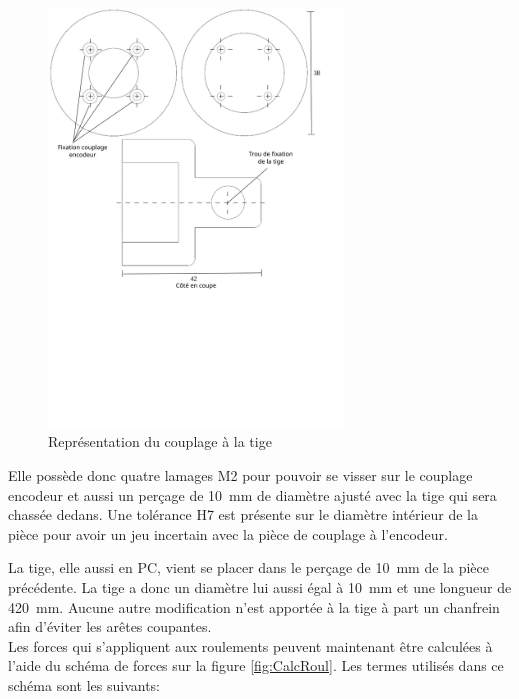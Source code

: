 \begin{figure}[H]
    \centering
    \includegraphics[width = 0.7\textwidth]{assets/figures/CouplageTige.svg}
    \caption{Représentation du couplage à la tige}
    \label{fig:CouplTige}
\end{figure}

Elle possède donc quatre lamages M2 pour pouvoir se visser sur le couplage encodeur et aussi un perçage de 10~mm de diamètre ajusté avec la tige
qui sera chassée dedans. Une tolérance H7 est présente sur le diamètre intérieur de la pièce pour avoir un jeu incertain avec la pièce de
couplage à l'encodeur.

La tige, elle aussi en \acrshort{PC}, vient se placer dans le perçage de 10~mm de la pièce précédente. La tige a donc un
diamètre lui aussi égal à 10~mm et une longueur de 420~mm. Aucune autre modification n'est apportée à la tige à part un chanfrein afin d'éviter
les arêtes coupantes.\\

Les forces qui s'appliquent aux roulements peuvent maintenant être calculées à l'aide du schéma de forces sur la figure \ref{fig:CalcRoul}.
Les termes utilisés dans ce schéma sont les suivants:

